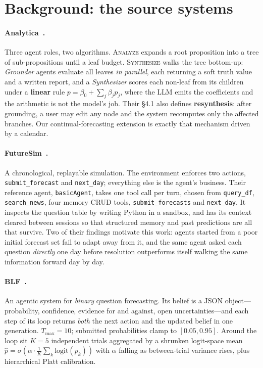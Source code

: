 \documentclass[10pt]{article}
\begin{document}
\section{Background: the source systems}\label{sec:bg}
\paragraph{Analytica~\cite{analytica}.} Three agent roles, two algorithms. \textsc{Analyze} expands
a root proposition into a tree of sub-propositions until a leaf budget. \textsc{Synthesize} walks
the tree bottom-up: \emph{Grounder} agents evaluate all leaves \emph{in parallel}, each returning a
soft truth value and a written report, and a \emph{Synthesizer} scores each non-leaf from its
children under a \textbf{linear} rule $p=\beta_0+\sum_j\beta_j p_j$, where the LLM emits the
coefficients and the arithmetic is not the model's job. Their §4.1 also defines \textbf{resynthesis}:
after grounding, a user may edit any node and the system recomputes only the affected branches. Our
continual-forecasting extension is exactly that mechanism driven by a calendar.

\paragraph{FutureSim~\cite{futuresim}.} A chronological, replayable simulation. The environment
enforces two actions, \texttt{submit\_forecast} and \texttt{next\_day}; everything else is the
agent's business. Their reference agent, \texttt{basicAgent}, takes one tool call per turn,
chosen from \texttt{query\_df}, \texttt{search\_news}, four memory CRUD tools,
\texttt{submit\_forecasts} and \texttt{next\_day}. It inspects the question table by writing
Python in a sandbox, and has its
context cleared between sessions so that structured memory and past predictions are all that
survive. Two of their findings motivate this work: agents started from a poor initial forecast set
fail to adapt away from it, and the same agent asked each question \emph{directly} one day before
resolution outperforms itself walking the same information forward day by day.

\paragraph{BLF~\cite{blf}.} An agentic system for \emph{binary} question forecasting. Its belief is
a JSON object---probability, confidence, evidence for and against, open uncertainties---and each
step of its loop returns \emph{both} the next action and the updated belief in one generation.
$T_{\max}{=}10$; submitted probabilities clamp to $[0.05,0.95]$. Around the loop sit $K{=}5$
independent trials aggregated by a shrunken logit-space mean
$\hat p=\sigma\!\left(\alpha\cdot\frac1K\sum_k\mathrm{logit}(p_k)\right)$ with $\alpha$ falling as
between-trial variance rises, plus hierarchical Platt calibration.
\end{document}

